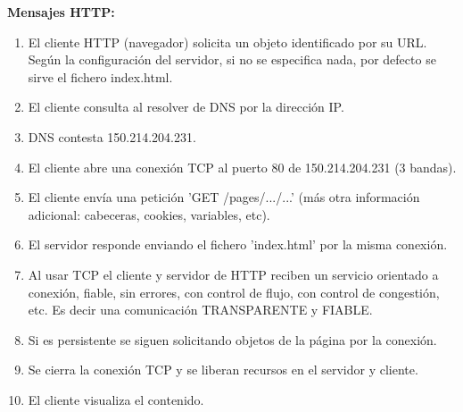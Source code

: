\documentclass[a4paper,11pt]{article}
\begin{document}
\textbf{Mensajes HTTP:}
\begin{enumerate}
\item El cliente HTTP (navegador) solicita un objeto identificado por su URL. Según la configuración del servidor, si no se especifica nada, por defecto se sirve el fichero index.html.
\item El cliente consulta al resolver de DNS por la dirección IP.
\item DNS contesta 150.214.204.231.
\item El cliente abre una conexión TCP al puerto 80 de 150.214.204.231 (3 bandas).
\item El cliente envía una petición 'GET /pages/.../...' (más otra información adicional: cabeceras, cookies, variables, etc).
\item El servidor responde enviando el fichero 'index.html' por la misma conexión.
\item Al usar TCP el cliente y servidor de HTTP reciben un servicio orientado a conexión, fiable, sin errores, con control de flujo, con control de congestión, etc. Es decir una comunicación TRANSPARENTE y FIABLE.
\item Si es persistente se siguen solicitando objetos de la página por la conexión.
\item Se cierra la conexión TCP y se liberan recursos en el servidor y cliente.
\item El cliente visualiza el contenido.
\end{enumerate}
\end{document}
